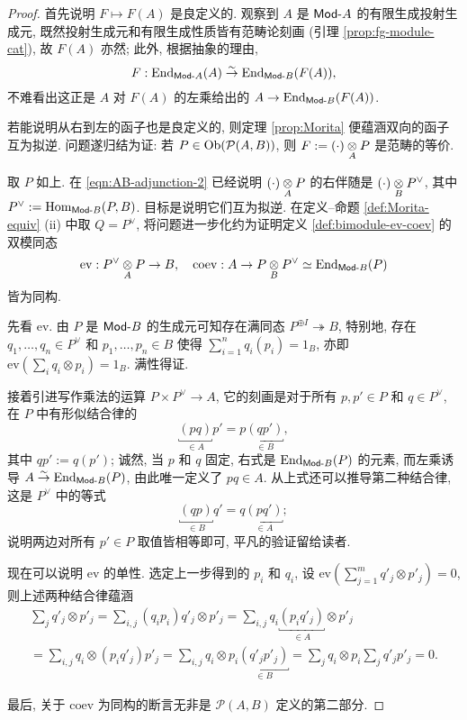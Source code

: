 \begin{proof}
	首先说明 $F \mapsto F(A)$ 是良定义的. 观察到 $A$ 是 $\mathsf{Mod}\text{-}A$ 的有限生成投射生成元, 既然投射生成元和有限生成性质皆有范畴论刻画 (引理 \ref{prop:fg-module-cat}), 故 $F(A)$ 亦然; 此外, 根据抽象的理由,
	\[ F: \operatorname{End}_{\mathsf{Mod}\text{-}A}(A) \stackrel{\sim}{\rightarrow} \operatorname{End}_{\mathsf{Mod}\text{-}B}(F(A)), \]
	不难看出这正是 $A$ 对 $F(A)$ 的左乘给出的 $A \to \operatorname{End}_{\mathsf{Mod}\text{-}B}(F(A))$.
	
	若能说明从右到左的函子也是良定义的, 则定理 \ref{prop:Morita} 便蕴涵双向的函子互为拟逆. 问题遂归结为证: 若 $P \in \operatorname{Ob}(\mathcal{P}(A, B))$, 则 $F := (\cdot) \underset{A}{\otimes} P$ 是范畴的等价.
	
	取 $P$ 如上. 在 \eqref{eqn:AB-adjunction-2} 已经说明 $(\cdot) \underset{A}{\otimes} P$ 的右伴随是 $(\cdot) \underset{B}{\otimes} P^\vee$, 其中 $P^\vee := \operatorname{Hom}_{\mathsf{Mod}\text{-}B}(P, B)$. 目标是说明它们互为拟逆. 在定义--命题 \ref{def:Morita-equiv} (ii) 中取 $Q = P^\vee$, 将问题进一步化约为证明定义 \ref{def:bimodule-ev-coev} 的双模同态
	\[ \mathrm{ev}: P^\vee \underset{A}{\otimes} P \to B, \quad \mathrm{coev}: A \to P \underset{B}{\otimes} P^\vee \simeq \operatorname{End}_{\mathsf{Mod}\text{-}B}(P) \]
	皆为同构.
	
	先看 $\mathrm{ev}$. 由 $P$ 是 $\mathsf{Mod}\text{-}B$ 的生成元可知存在满同态 $P^{\oplus I} \twoheadrightarrow B$, 特别地, 存在 $q_1, \ldots, q_n \in P^\vee$ 和 $p_1, \ldots, p_n \in B$ 使得 $\sum_{i=1}^n q_i(p_i) = 1_B$, 亦即 $\mathrm{ev}(\sum_i q_i \otimes p_i) = 1_B$. 满性得证.
	
	接着引进写作乘法的运算 $P \times P^\vee \to A$, 它的刻画是对于所有 $p, p' \in P$ 和 $q \in P^\vee$, 在 $P$ 中有形似结合律的
	\[ \underbracket{(pq)}_{\in A} p' = p \underbracket{(qp')}_{\in B}, \]
	其中 $qp' := q(p')$; 诚然, 当 $p$ 和 $q$ 固定, 右式是 $\operatorname{End}_{\mathsf{Mod}\text{-}B}(P)$ 的元素, 而左乘诱导 $A \stackrel{\sim}{\rightarrow} \operatorname{End}_{\mathsf{Mod}\text{-}B}(P)$, 由此唯一定义了 $pq \in A$. 从上式还可以推导第二种结合律, 这是 $P^\vee$ 中的等式
	\[ \underbracket{(qp)}_{\in B} q' = q \underbracket{(pq')}_{\in A}; \]
	说明两边对所有 $p' \in P$ 取值皆相等即可, 平凡的验证留给读者.

	现在可以说明 $\mathrm{ev}$ 的单性. 选定上一步得到的 $p_i$ 和 $q_i$, 设 $\mathrm{ev}(\sum_{j=1}^m q'_j \otimes p'_j) = 0$, 则上述两种结合律蕴涵
	\begin{multline*}
		\sum_j q'_j \otimes p'_j = \sum_{i, j} (q_i p_i) q'_j \otimes p'_j
		= \sum_{i, j} q_i \underbracket{(p_i q'_j)}_{\in A} \otimes p'_j \\
		= \sum_{i, j} q_i \otimes (p_i q'_j) p'_j
		= \sum_{i, j} q_i \otimes p_i \underbracket{(q'_j p'_j)}_{\in B}
		= \sum_j q_i \otimes p_i \sum_j q'_j p'_j = 0.
	\end{multline*}

	最后, 关于 $\mathrm{coev}$ 为同构的断言无非是 $\mathcal{P}(A, B)$ 定义的第二部分.
\end{proof}

